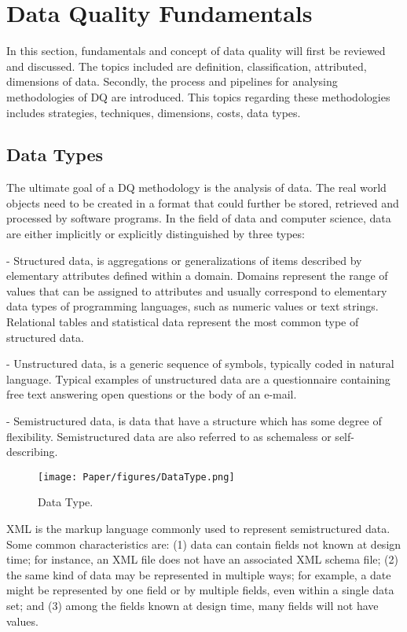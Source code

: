 \documentclass[pdftex,english,oribibl]{llncs}
\begin{document}
\section{Data Quality Fundamentals}
In this section, fundamentals and concept of data quality will first be reviewed and discussed.
The topics included are definition, classification, attributed, dimensions of data.
Secondly, the process and pipelines for analysing methodologies of DQ are introduced.
This topics regarding these methodologies includes strategies, techniques, dimensions,
costs, data types.

\subsection{Data Types}
The ultimate goal of a DQ methodology is the analysis of data.
The real world objects need to be created in a format that could further be stored, retrieved and processed by software programs.
In the field of data and computer science, data are either implicitly or explicitly distinguished by three types:

- Structured data, is aggregations or generalizations of items described by elementary attributes defined within a domain.
Domains represent the range of values that can be assigned to attributes and usually correspond to elementary data types of programming languages, such as numeric values or text strings.
Relational tables and statistical data represent the most common type of structured data.

- Unstructured data, is a generic sequence of symbols, typically coded in natural language.
Typical examples of unstructured data are a questionnaire containing free text answering open questions or the body of an e-mail.

- Semistructured data, is data that have a structure which has some degree of flexibility. Semistructured data are also referred to as schemaless or self-describing.
  \begin{figure}
    \centering
    \texttt{[image: Paper/figures/DataType.png]}
    \caption{Data Type.}
    \label{fig:datatype}
  \end{figure}
 XML is the markup language commonly used to represent semistructured data.
 Some common characteristics are:
 (1) data can contain fields not known at design time; for instance, an XML file does not have an associated XML schema file;
 (2) the same kind of data may be represented in multiple ways; for example, a date might be represented by one field or by multiple fields, even within a single data set; and
 (3) among the fields known at design time, many fields will not have values.
\end{document}
